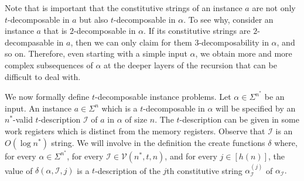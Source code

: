 \documentclass[12pt]{article}
\theoremstyle{definition}
\begin{document}
Note that is important that the constitutive strings of an instance $a$ are not only $t$-decomposable in $a$ but also $t$-decomposable in $\alpha$. To see why, consider an instance $a$ that is $2$-decomposable in $\alpha$. If its constitutive strings are $2$-decompasable in $a$, then we can only claim for them $3$-decomposability in $\alpha$, and so on. Therefore, even starting with a simple input $\alpha$, we obtain more and more complex subsequences of $\alpha$ at the deeper layers of the recursion that can be difficult to deal with.


We now formally define $t$-decomposable instance problems.  
Let $\alpha \in \Sigma^{n^*}$ be an input. 
An instance $a \in \Sigma^n$ which is a $t$-decomposable in $\alpha$ will be specified by an $n^*$-valid $t$-description 
$\mathcal{I}$ of $a$ in $\alpha$ of size $n$. The $t$-description can be given in some work registers which is distinct from the memory registers.
Observe that $\mathcal{I}$ is an $O(\log {n^*})$ string.
We will involve in the definition the create functions $\delta$ where, for every $\alpha \in \Sigma^{n^*}$, for every $\mathcal{I} \in  \mathcal{V}(n^*,t,n)$, and for every $j \in [h(n)]$, the value of $\delta(\alpha, \mathcal{I}, j)$ is a $t$-description of the $j$th constitutive string $\alpha_{\mathcal{I}}^{(j)}$ of $\alpha_{\mathcal{I}}.$
\end{document}

